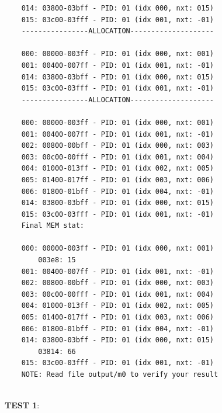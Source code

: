 \documentclass[a4paper]{article}
\begin{document}
\begin{lstlisting}
    014: 03800-03bff - PID: 01 (idx 000, nxt: 015)
    015: 03c00-03fff - PID: 01 (idx 001, nxt: -01)
    ----------------ALLOCATION--------------------
    
    000: 00000-003ff - PID: 01 (idx 000, nxt: 001)
    001: 00400-007ff - PID: 01 (idx 001, nxt: -01)
    014: 03800-03bff - PID: 01 (idx 000, nxt: 015)
    015: 03c00-03fff - PID: 01 (idx 001, nxt: -01)
    ----------------ALLOCATION--------------------
    
    000: 00000-003ff - PID: 01 (idx 000, nxt: 001)
    001: 00400-007ff - PID: 01 (idx 001, nxt: -01)
    002: 00800-00bff - PID: 01 (idx 000, nxt: 003)
    003: 00c00-00fff - PID: 01 (idx 001, nxt: 004)
    004: 01000-013ff - PID: 01 (idx 002, nxt: 005)
    005: 01400-017ff - PID: 01 (idx 003, nxt: 006)
    006: 01800-01bff - PID: 01 (idx 004, nxt: -01)
    014: 03800-03bff - PID: 01 (idx 000, nxt: 015)
    015: 03c00-03fff - PID: 01 (idx 001, nxt: -01)
    Final MEM stat: 
    
    000: 00000-003ff - PID: 01 (idx 000, nxt: 001)
    	003e8: 15
    001: 00400-007ff - PID: 01 (idx 001, nxt: -01)
    002: 00800-00bff - PID: 01 (idx 000, nxt: 003)
    003: 00c00-00fff - PID: 01 (idx 001, nxt: 004)
    004: 01000-013ff - PID: 01 (idx 002, nxt: 005)
    005: 01400-017ff - PID: 01 (idx 003, nxt: 006)
    006: 01800-01bff - PID: 01 (idx 004, nxt: -01)
    014: 03800-03bff - PID: 01 (idx 000, nxt: 015)
    	03814: 66
    015: 03c00-03fff - PID: 01 (idx 001, nxt: -01)
    NOTE: Read file output/m0 to verify your result
    \end{lstlisting}
    \\
    {\bfseries TEST 1}: \\
\end{document}
